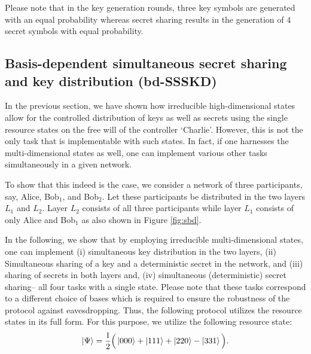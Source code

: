 \documentclass[fleqn,10pt]{wlscirep}
\begin{document}
Please note that in the key generation rounds, three key symbols are generated with an equal probability whereas secret sharing results in the generation of $4$ secret symbols with equal probability.

\subsection*{Basis-dependent simultaneous  secret sharing and key distribution (bd-SSSKD)}
\hypertarget{Basis-dependent simultaneous secret sharing and key distribution}{}
In the previous section, we have shown how irreducible high-dimensional states allow for the controlled distribution of keys as well as secrets using the single resource states on the free will of the controller `Charlie'. However, this is not the only task that is implementable with such states. In fact, if one harnesses the multi-dimensional states as well, one can implement various other tasks simultaneously in a given network. 

To show that this indeed is the case, we consider a network of three participants, say, Alice, Bob$_1$, and Bob$_2$. Let these participants be distributed in the two layers $L_1$ and $L_2$. Layer $L_2$ consists of all three participants while layer $L_1$ consists of only Alice and Bob$_1$ as also shown in Figure \ref{fig:sbd}.

 
In the following, we show that by employing irreducible multi-dimensional states, one can implement (i) simultaneous key distribution in the two layers, (ii) Simultaneous sharing of a key and a deterministic secret in the network, and (iii) sharing of secrets in both layers and, (iv) simultaneous (deterministic) secret sharing-- all four tasks with a single state. Please note that these tasks correspond to a different choice of bases which is required to ensure the robustness of the protocol against eavesdropping. Thus, the following protocol utilizes the resource states in its full form. For this purpose, we utilize the following resource state:
\begin{align}
    \ket{\Psi}=\frac{1}{2}\Big(\ket{000}+\ket{111}+\ket{220}-\ket{331}\Big).
\end{align}
\end{document}
